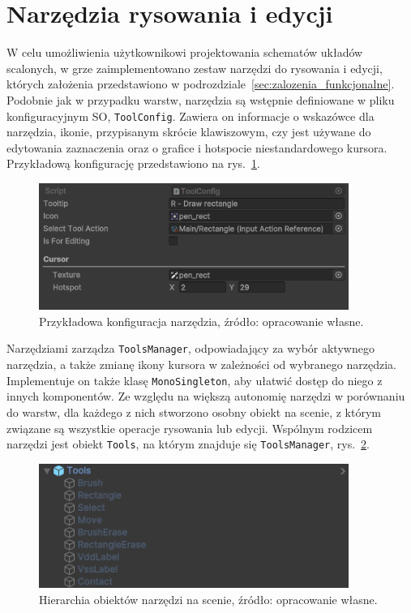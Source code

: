 \section{Narzędzia rysowania i edycji}
\label{sec:narzedzia_rysowania_i_edycji}

W celu umożliwienia użytkownikowi projektowania schematów układów scalo\-nych,
w grze zaimplementowano zestaw narzędzi do rysowania i edycji, których założenia przedstawiono w podrozdziale~\ref{sec:zalozenia_funkcjonalne}.
Podobnie jak w przypadku warstw, narzędzia są wstępnie definiowane w pliku konfiguracyjnym SO, \texttt{ToolConfig}.
Zawiera on informacje o wskazówce dla narzędzia, ikonie, przypisanym skrócie klawiszowym, czy jest używane do edytowania zaznaczenia
oraz o grafice i hotspocie niestandardowego kursora.
Przykładową konfigurację przedstawiono na rys.~\ref{fig:tool_config}.

\begin{figure}[h!]
    \centering
    \includegraphics[width=0.9\textwidth]{chapters/chapter4/rys/tool_config}
    \caption[Przykładowa konfiguracja narzędzia.]{Przykładowa konfiguracja narzędzia, źródło: opracowanie własne.}
    \label{fig:tool_config}
\end{figure}

Narzędziami zarządza \texttt{ToolsManager}, odpowiadający za wybór aktywnego narzędzia,
a także zmianę ikony kursora w zależności od wybranego narzędzia.
Implementuje on także klasę \texttt{MonoSingleton}, aby ułatwić dostęp do niego z innych komponentów.
Ze względu na większą autonomię narzędzi w porównaniu do warstw,
dla każdego z nich stworzono osobny obiekt na scenie, z którym związane są wszystkie operacje rysowania lub edycji.
Wspólnym rodzicem narzędzi jest obiekt \texttt{Tools}, na którym znajduje się \texttt{ToolsManager},
rys.~\ref{fig:tools_hierarchy}.

\begin{figure}[h!]
    \centering
    \includegraphics[width=0.9\textwidth]{chapters/chapter4/rys/tools_hierarchy}
    \caption[Hierarchia obiektów narzędzi na scenie.]{Hierarchia obiektów narzędzi na scenie, źródło: opracowanie własne.}
    \label{fig:tools_hierarchy}
\end{figure}

